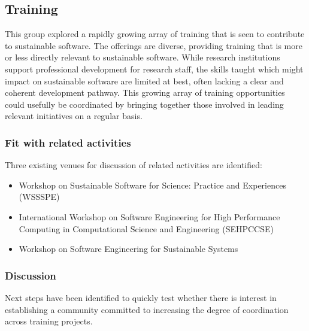 \subsection{Training}


This group explored a rapidly growing array of training that is seen to
contribute to sustainable software. The offerings are diverse, providing
training that is more or less directly relevant to sustainable software. While
research institutions support professional development for research staff, the
skills taught which might impact on sustainable software are limited at best,
often lacking a clear and coherent development pathway. This growing array of
training opportunities could usefully be coordinated by bringing together those
involved in leading relevant initiatives on a regular basis.

\subsubsection{Fit with related activities} Three existing venues for discussion
of related activities are identified:

\begin{itemize}

\item Workshop on Sustainable Software for Science: Practice and
Experiences (WSSSPE)~\cite{WSSSPE}

\item International Workshop on Software Engineering for High
Performance Computing in Computational Science and
Engineering (SEHPCCSE)~\cite{SEHPCCSE}

\item Workshop on Software Engineering for Sustainable Systems~\cite{se4susy}

\end{itemize}

\subsubsection{Discussion}

Next steps have been identified to quickly test whether there is interest in
establishing a community committed to increasing the degree of coordination
across training projects.

